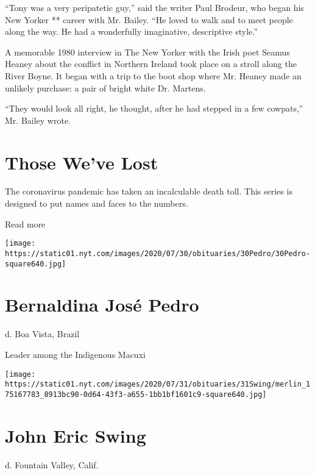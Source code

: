 ``Tony was a very peripatetic guy,'' said the writer Paul Brodeur, who
began his New Yorker ** career with Mr. Bailey. ``He loved to walk and
to meet people along the way. He had a wonderfully imaginative,
descriptive style.''

A memorable 1980 interview in The New Yorker with the Irish poet Seamus
Heaney about the conflict in Northern Ireland took place on a stroll
along the River Boyne. It began with a trip to the boot shop where Mr.
Heaney made an unlikely purchase: a pair of bright white Dr. Martens.

``They would look all right, he thought, after he had stepped in a few
cowpats,'' Mr. Bailey wrote.

\href{https://www.nytimes.com/interactive/2020/obituaries/people-died-coronavirus-obituaries.html?action=click\&pgtype=Article\&state=default\&region=BELOW_MAIN_CONTENT\&context=covid_obits_promo}{}

\hypertarget{those-weve-lost}{%
\section{Those We've Lost}\label{those-weve-lost}}

The coronavirus pandemic has taken an incalculable death toll. This
series is designed to put names and faces to the numbers.

Read more

\texttt{[image: https://static01.nyt.com/images/2020/07/30/obituaries/30Pedro/30Pedro-square640.jpg]}

\hypertarget{bernaldina-josuxe9-pedro}{%
\section{Bernaldina José Pedro}\label{bernaldina-josuxe9-pedro}}

d. Boa Vista, Brazil

Leader among the Indigenous Macuxi

\texttt{[image: https://static01.nyt.com/images/2020/07/31/obituaries/31Swing/merlin\_175167783\_8913bc90-0d64-43f3-a655-1bb1bf1601c9-square640.jpg]}

\hypertarget{john-eric-swing}{%
\section{John Eric Swing}\label{john-eric-swing}}

d. Fountain Valley, Calif.

